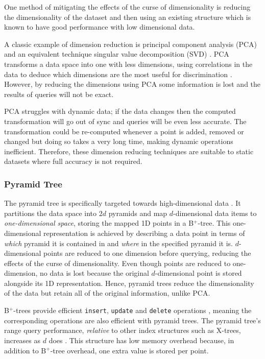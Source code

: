 One method of mitigating the effects of the curse of dimensionality is reducing the dimensionality of the dataset and then using an existing structure which is known to have good performance with low dimensional data.


A classic example of dimension reduction is principal component analysis (PCA) \cite{pca} and an equivalent technique singular value decomposition (SVD) \cite{md-structures-samet}. PCA transforms a data space into one with less dimensions, using correlations in the data to deduce which dimensions are the most useful for discrimination \cite{pca}. However, by reducing the dimensions using PCA some information is lost and the results of queries will not be exact.

PCA struggles with dynamic data; if the data changes then the computed transformation will go out of sync and queries will be even less accurate. The transformation could be re-computed whenever a point is added, removed or changed but doing so takes a very long time, making dynamic operations inefficient. Therefore, these dimension reducing techniques are suitable to static datasets where full accuracy is not required.

\subsubsection{Pyramid Tree}
\label{sec:pyramid-tree}

The pyramid tree is specifically targeted towards high-dimensional data \cite{pyramid-tree}. It partitions the data space into $2d$ pyramids and map $d$-dimensional data items to \textit{one-dimensional space}, storing the mapped 1D points in a B${}^{+}$-tree. This one-dimensional representation is achieved by describing a data point in terms of \textit{which} pyramid it is contained in and \textit{where} in the specified pyramid it is. $d$-dimensional points are reduced to one dimension before querying, reducing the effects of the curse of dimensionality. Even though points are reduced to one-dimension, no data is lost because the original $d$-dimensional point is stored alongside its 1D representation. Hence, pyramid trees reduce the dimensionality of the data but retain all of the original information, unlike PCA.

B${}^{+}$-trees provide efficient \texttt{insert}, \texttt{update} and \texttt{delete} operations \cite{ubiquitous-btree}, meaning the corresponding operations are also efficient with pyramid trees. The pyramid tree's range query performance, \textit{relative} to other index structures such as X-trees, increases as $d$ does \cite{pyramid-tree}. This structure has low memory overhead because, in addition to B${}^{+}$-tree overhead, one extra value is stored per point.

